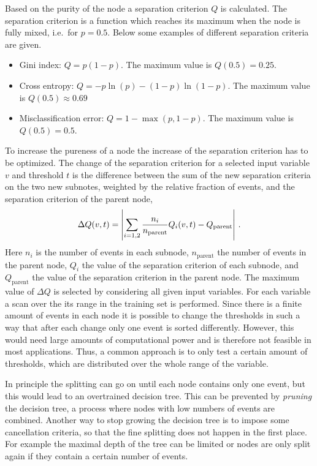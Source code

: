 Based on the purity of the node a separation criterion $Q$ is calculated.
The separation criterion is a function which reaches its maximum when the node is fully mixed, i.e.\ for $p = 0.5$.
Below some examples of different separation criteria are given.
\begin{itemize}
    \item Gini index: $Q = p (1-p)$. The maximum value is $Q(0.5) = 0.25$.
    \item Cross entropy: $Q = -p  \ln(p) - (1 - p) \ln (1 - p)$. The maximum value is $Q(0.5) \approx 0.69$
    \item Misclassification error: $Q = 1 - \max (p, 1 - p)$. The maximum value is $Q(0.5) = 0.5$.
\end{itemize}
To increase the pureness of a node the increase of the separation criterion has to be optimized.
The change of the separation criterion for a selected input variable $v$ and threshold $t$
is the difference between the sum of the new separation criteria on the two new subnotes, weighted
by the relative fraction of events, and the separation criterion of the parent node,
\begin{equation}
    \label{eq:bdt:deltaQ}
    \Delta Q(v, t) = \left|\sum_{i=1,2} \frac{n_i}{n_\text{parent}} Q_i (v, t) - Q_\text{parent}\right| \,.
\end{equation}
Here $n_i$ is the number of events in each subnode, $n_\text{parent}$ the number of events in the parent node,
$Q_i$ the value of the separation criterion of each subnode, and $Q_\text{parent}$ the value of the separation criterion
in the parent node.
The maximum value of $\Delta Q$ is selected by considering all given input variables.
For each variable a scan over the its range in the training set is performed.
Since there is a finite amount of events in each node it is possible to change the thresholds in such a way that after
each change only one event is sorted differently.
However, this would need large amounts of computational power and is therefore not feasible in most applications.
Thus, a common approach is to only test a certain amount of thresholds, which are distributed over the whole range
of the variable.

In principle the splitting can go on until each node contains only one event, but this would lead
to an overtrained decision tree.
This can be prevented by \emph{pruning} the decision tree, a process where nodes with low numbers of events are combined.
Another way to stop growing the decision tree is to impose some cancellation criteria, so that the fine splitting
does not happen in the first place.
For example the maximal depth of the tree can be limited or nodes are only split again if they
contain a certain number of events.

